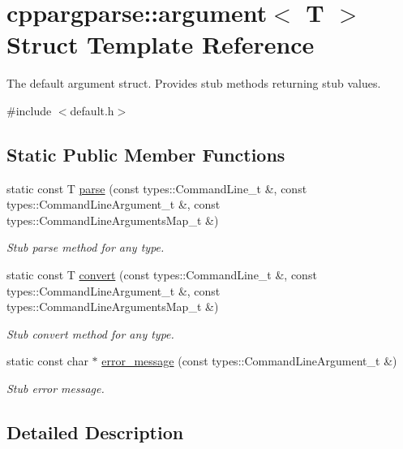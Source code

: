 \hypertarget{structcppargparse_1_1argument}{}\section{cppargparse\+:\+:argument$<$ T $>$ Struct Template Reference}
\label{structcppargparse_1_1argument}


The default argument struct. Provides stub methods returning stub values.  




{\ttfamily \#include $<$default.\+h$>$}

\subsection*{Static Public Member Functions}
\begin{DoxyCompactItemize}
\item 
static const T \hyperlink{structcppargparse_1_1argument_a45846753c88bdff65453703bb481ec61}{parse} (const types\+::\+Command\+Line\+\_\+t \&, const types\+::\+Command\+Line\+Argument\+\_\+t \&, const types\+::\+Command\+Line\+Arguments\+Map\+\_\+t \&)
\begin{DoxyCompactList}\small\item\em Stub parse method for any type. \end{DoxyCompactList}\item 
static const T \hyperlink{structcppargparse_1_1argument_a15705823db542d0e79b27298f4723ef6}{convert} (const types\+::\+Command\+Line\+\_\+t \&, const types\+::\+Command\+Line\+Argument\+\_\+t \&, const types\+::\+Command\+Line\+Arguments\+Map\+\_\+t \&)
\begin{DoxyCompactList}\small\item\em Stub convert method for any type. \end{DoxyCompactList}\item 
static const char $\ast$ \hyperlink{structcppargparse_1_1argument_aabd56cfa910d9e3d60b009f593b123a6}{error\+\_\+message} (const types\+::\+Command\+Line\+Argument\+\_\+t \&)
\begin{DoxyCompactList}\small\item\em Stub error message. \end{DoxyCompactList}\end{DoxyCompactItemize}


\subsection{Detailed Description}
